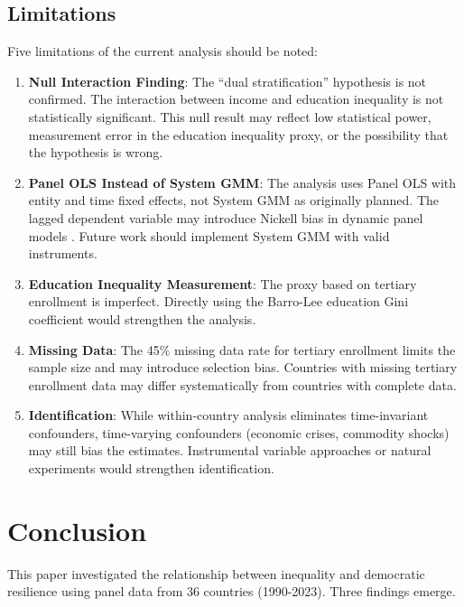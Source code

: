 \documentclass[11pt,letterpaper]{article}
\begin{document}
\subsection{Limitations}

Five limitations of the current analysis should be noted:

\begin{enumerate}
  \item \textbf{Null Interaction Finding}: The ``dual stratification'' hypothesis is not confirmed. The interaction between income and education inequality is not statistically significant. This null result may reflect low statistical power, measurement error in the education inequality proxy, or the possibility that the hypothesis is wrong.

  \item \textbf{Panel OLS Instead of System GMM}: The analysis uses Panel OLS with entity and time fixed effects, not System GMM as originally planned. The lagged dependent variable may introduce Nickell bias in dynamic panel models \cite{Nickell1981}. Future work should implement System GMM with valid instruments.

  \item \textbf{Education Inequality Measurement}: The proxy based on tertiary enrollment is imperfect. Directly using the Barro-Lee education Gini coefficient \cite{Thomas2001} would strengthen the analysis.

  \item \textbf{Missing Data}: The 45\% missing data rate for tertiary enrollment limits the sample size and may introduce selection bias. Countries with missing tertiary enrollment data may differ systematically from countries with complete data.

  \item \textbf{Identification}: While within-country analysis eliminates time-invariant confounders, time-varying confounders (economic crises, commodity shocks) may still bias the estimates. Instrumental variable approaches or natural experiments would strengthen identification.
\end{enumerate}

\section{Conclusion}

This paper investigated the relationship between inequality and democratic resilience using panel data from 36 countries (1990-2023). Three findings emerge.
\end{document}
